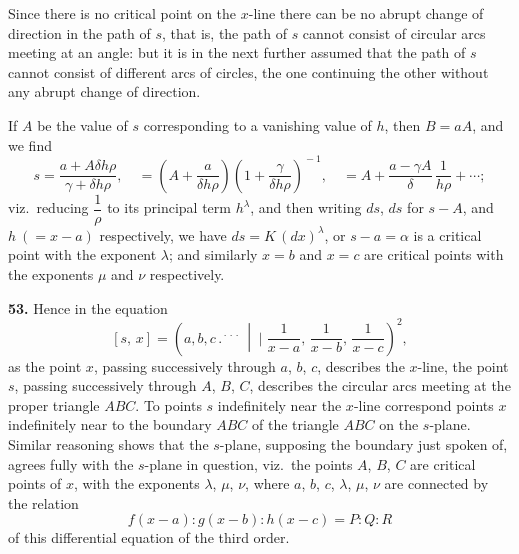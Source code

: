 \documentclass[11pt]{article}
\newcommand{\artno}[1]{\textbf{#1.}\quad}
\begin{document}
\noindent\small * Since there is no critical point on the $x$-line there can be no abrupt change of direction in the path
of $s$, that is, the path of $s$ cannot consist of circular arcs meeting at an angle: but it is in the next
further assumed that the path of $s$ cannot consist of different arcs of circles, the one continuing the other
without any abrupt change of direction.\normalsize

\newpage
If $A$ be the value of $s$ corresponding to a vanishing value of $h$, then $B = aA$, and we find
\[
   s = \frac{a + A\delta h\rho}{\gamma + \delta h\rho},\quad = \left(A + \frac{a}{\delta h\rho}\right)\!\left(1 + \frac{\gamma}{\delta h\rho}\right)^{\!-1},\quad = A + \frac{a - \gamma A}{\delta}\,\frac{1}{h\rho} + \cdots;
\]
viz.\ reducing $\dfrac{1}{\rho}$ to its principal term $h^{\lambda}$, and then writing $ds$, $ds$ for $s - A$, and $h\ (=x-a)$
respectively, we have $ds = K\,(dx)^{\lambda}$, or $s - a = \alpha$ is a critical point with the exponent $\lambda$;
and similarly $x = b$ and $x = c$ are critical points with the exponents $\mu$ and $\nu$ respectively.

\artno{53} Hence in the equation
\[
   [s,\,x] = \left(a, b, c \,.{}^{\!\cdot\!\cdot\!\cdot}\,\middle|\!\!\!\mid \frac{1}{x-a},\,\frac{1}{x-b},\,\frac{1}{x-c}\right)^{\!2},
\]
as the point $x$, passing successively through $a$, $b$, $c$, describes the $x$-line, the point $s$,
passing successively through $A$, $B$, $C$, describes the circular arcs meeting at the proper
triangle $ABC$. To points $s$ indefinitely near the $x$-line correspond points $x$ indefinitely
near to the boundary $ABC$ of the triangle $ABC$ on the $s$-plane. Similar reasoning shows
that the $s$-plane, supposing the boundary just spoken of, agrees fully with the $s$-plane in question, viz.\ the points $A$, $B$, $C$ are critical points of $x$, with the exponents $\lambda$, $\mu$, $\nu$,
where $a$, $b$, $c$, $\lambda$, $\mu$, $\nu$ are connected by the relation
\[
   f(x-a) : g(x-b) : h(x-c) = P : Q : R
\]
of this differential equation of the third order.
\end{document}
